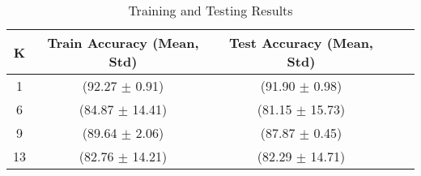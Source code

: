 \begin{table}[h!]
\centering
\begin{tabular}{|c|c|c|c|c|}
\hline
K & Train Accuracy (Mean, Std) & Test Accuracy (Mean, Std)\\
\hline
1 & (92.27 $\pm$ 0.91) & (91.90 $\pm$ 0.98)\\
6 & (84.87 $\pm$ 14.41) & (81.15 $\pm$ 15.73)\\
9 & (89.64 $\pm$ 2.06) & (87.87 $\pm$ 0.45)\\
13 & (82.76 $\pm$ 14.21) & (82.29 $\pm$ 14.71)\\
\hline
\end{tabular}
\caption{Training and Testing Results}
\label{tab:results}
\end{table}